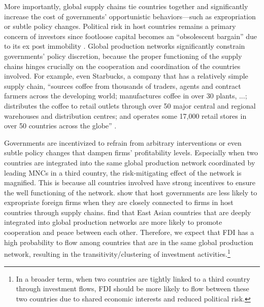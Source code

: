 \documentclass[reqno,onecolumn,letterpaper,12pt]{article}
\begin{document}
More importantly, global supply chains tie countries together and significantly increase the cost of governments' opportunistic behaviors---such as expropriation or subtle policy changes. Political risk in host countries remains a primary concern of investors since footloose capital becomes an ``obsolescent bargain'' due to its ex post immobility \citep{Vernon:1971,Vernon:1980}. Global production networks significantly constrain governments' policy discretion, because the proper functioning of the supply chains hinges crucially on the cooperation and coordination of the countries involved. For example, even Starbucks, a company that has a relatively simple supply chain, ``sources coffee from thousands of traders, agents and contract farmers across the developing world; manufactures coffee in over 30 plants, ...; distributes the coffee to retail outlets through over 50 major central and regional warehouses and distribution centres; and operates some 17,000 retail stores in over 50 countries across the globe'' \citep[142]{UNCTAD:2013}.

Governments are incentivized to refrain from arbitrary interventions or even subtle policy changes that dampen firms' profitability levels. Especially when two countries are integrated into the same global production network coordinated by leading MNCs in a third country, the risk-mitigating effect of the network is magnified. This is because all countries involved have strong incentives to ensure the well functioning of the network. \citet{johns2016under} show that host governments are less likely to expropriate foreign firms when they are closely connected to firms in host countries through supply chains. \citet{Kim_Solingen:2017} find that East Asian countries that are deeply integrated into global production networks are more likely to promote cooperation and peace between each other. Therefore, we expect that FDI has a high probability to flow among countries that are in the same global production network, resulting in the transitivity/clustering of investment activities.\footnote{In a broader term, when two countries are tightly linked to a third country through investment flows, FDI should be more likely to flow between these two countries due to shared economic interests and reduced political risk. }
\end{document}
